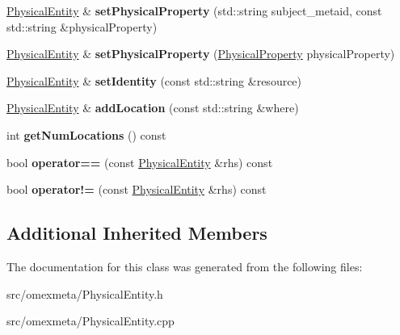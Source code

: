 \begin{DoxyCompactItemize}
\hyperlink{classomexmeta_1_1PhysicalEntity}{Physical\+Entity} \& {\bfseries set\+Physical\+Property} (std\+::string subject\+\_\+metaid, const std\+::string \&physical\+Property)
\item 
\mbox{\label{classomexmeta_1_1PhysicalEntity_a9bca0cb13601b6f9617df9f264968f1f}} 
\hyperlink{classomexmeta_1_1PhysicalEntity}{Physical\+Entity} \& {\bfseries set\+Physical\+Property} (\hyperlink{classomexmeta_1_1PhysicalProperty}{Physical\+Property} physical\+Property)
\item 
\mbox{\label{classomexmeta_1_1PhysicalEntity_a4d4c3ee9572b19e44e79a44f18f1ac31}} 
\hyperlink{classomexmeta_1_1PhysicalEntity}{Physical\+Entity} \& {\bfseries set\+Identity} (const std\+::string \&resource)
\item 
\mbox{\label{classomexmeta_1_1PhysicalEntity_a82e77be3327c537b2426b571afaa5045}} 
\hyperlink{classomexmeta_1_1PhysicalEntity}{Physical\+Entity} \& {\bfseries add\+Location} (const std\+::string \&where)
\item 
\mbox{\label{classomexmeta_1_1PhysicalEntity_a33559c90dbe3e3be1b71898ab9a5bfa4}} 
int {\bfseries get\+Num\+Locations} () const
\item 
\mbox{\label{classomexmeta_1_1PhysicalEntity_a5f54e5c2df0fd5c3b9121e1426b23af6}} 
bool {\bfseries operator==} (const \hyperlink{classomexmeta_1_1PhysicalEntity}{Physical\+Entity} \&rhs) const
\item 
\mbox{\label{classomexmeta_1_1PhysicalEntity_afee546a420f16e128ed1add9fec35b4f}} 
bool {\bfseries operator!=} (const \hyperlink{classomexmeta_1_1PhysicalEntity}{Physical\+Entity} \&rhs) const
\end{DoxyCompactItemize}
\subsection*{Additional Inherited Members}


The documentation for this class was generated from the following files\+:\begin{DoxyCompactItemize}
\item 
src/omexmeta/Physical\+Entity.\+h\item 
src/omexmeta/Physical\+Entity.\+cpp\end{DoxyCompactItemize}
